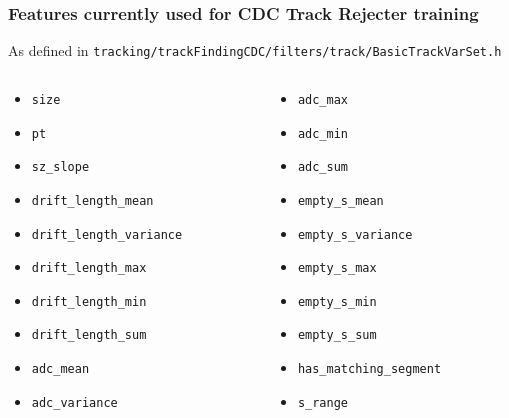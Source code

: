 \documentclass[18pt]{beamer}
\begin{document}
\begin{frame}
  \frametitle{Features currently used for CDC Track Rejecter training}
  As defined in \texttt{tracking/trackFindingCDC/filters/track/BasicTrackVarSet.h}
  \begin{columns}
    \begin{column}{0.5\textwidth}
      \begin{itemize}
      \item \lstinline{size}
      \item \lstinline{pt}
      \item \lstinline{sz_slope}
      \item \lstinline{drift_length_mean}
      \item \lstinline{drift_length_variance}
      \item \lstinline{drift_length_max}
      \item \lstinline{drift_length_min}
      \item \lstinline{drift_length_sum}
      \item \lstinline{adc_mean}
      \item \lstinline{adc_variance}
      \end{itemize}
    \end{column}
    \begin{column}{0.5\textwidth}
      \begin{itemize}

      \item \lstinline{adc_max}
      \item \lstinline{adc_min}
      \item \lstinline{adc_sum}
      \item \lstinline{empty_s_mean}
      \item \lstinline{empty_s_variance}
      \item \lstinline{empty_s_max}
      \item \lstinline{empty_s_min}
      \item \lstinline{empty_s_sum}
      \item \lstinline{has_matching_segment}
      \item \lstinline{s_range}
      \end{itemize}      
    \end{column}
  \end{columns}

\end{frame}
\end{document}

